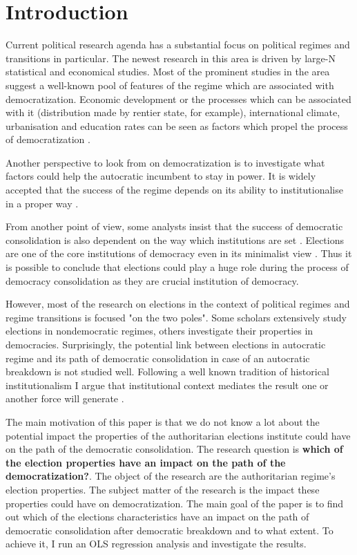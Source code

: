 \documentclass[a4paper, 12pt]{article}
\begin{document}
\section*{Introduction}
Current political research agenda has a substantial focus on political regimes and transitions in particular. The newest research in this area is driven by large-N statistical and economical studies. Most of the prominent studies in the area suggest a well-known pool of features of the regime which are associated with democratization. Economic development or the processes which can be associated with it (distribution made by rentier state, for example), international climate, urbanisation and education rates can be seen as factors which propel the process of democratization \parencite{geddes_what_2007}. \par  Another perspective to look from on democratization is to investigate what factors could help the autocratic incumbent to stay in power. It is widely accepted that the success of the regime depends on its ability to institutionalise in a proper way \parencite{gerschewski_three_2013}.  \par From another point of view, some analysts insist that the success of democratic consolidation is also dependent on the way which institutions are set \parencite{schedler_what_1998}. Elections are one of the core institutions of democracy even in its minimalist view \parencite{odonnell_democracy_2001}. Thus it is possible to conclude that elections could play a huge role during the process of democracy consolidation as they are crucial institution of democracy. \par However, most of the research on elections in the context of political regimes and regime transitions is focused "on the two poles". Some scholars extensively study elections in nondemocratic regimes, others investigate their properties in democracies. Surprisingly, the potential link between elections in autocratic regime and its path of democratic consolidation in case of an autocratic breakdown is not studied well. Following a well known tradition of historical institutionalism I argue that institutional context mediates the result one or another force will generate \parencite{hall_political_1996}. \par The main motivation of this paper is that we do not know a lot about the potential impact the properties of the authoritarian elections institute could have on the path of the democratic consolidation. The research question is \textbf{which of the election properties have an impact on the path of the democratization?}. The object of the research are the authoritarian regime's election properties. The subject matter of the research is the impact these properties could have on democratization. The main goal of the paper is to find out which of the elections characteristics have an impact on the path of democratic consolidation after democratic breakdown and to what extent. To achieve it, I run an OLS regression analysis and investigate the results. \par
\end{document}
